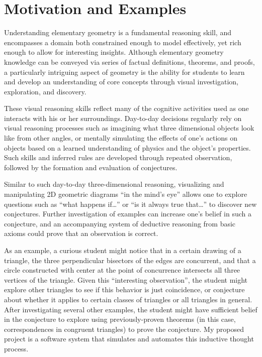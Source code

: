\chapter{Motivation and Examples}
\label{chap:motivation}

Understanding elementary geometry is a fundamental reasoning skill,
and encompasses a domain both constrained enough to model effectively,
yet rich enough to allow for interesting insights.  Although
elementary geometry knowledge can be conveyed via series of factual
definitions, theorems, and proofs, a particularly intriguing aspect of
geometry is the ability for students to learn and develop an
understanding of core concepts through visual investigation,
exploration, and discovery.

These visual reasoning skills reflect many of the cognitive activities
used as one interacts with his or her surroundings.  Day-to-day
decisions regularly rely on visual reasoning processes such as
imagining what three dimensional objects look like from other angles,
or mentally simulating the effects of one's actions on objects based
on a learned understanding of physics and the object's properties.
Such skills and inferred rules are developed through repeated
observation, followed by the formation and evaluation of conjectures.

Similar to such day-to-day three-dimensional reasoning, visualizing
and manipulating 2D geometric diagrams ``in the mind's eye'' allows
one to explore questions such as ``what happens if\ldots''  or ``is it
always true that\ldots''  to discover new conjectures.  Further
investigation of examples can increase one's belief in such a
conjecture, and an accompanying system of deductive reasoning from
basic axioms could prove that an observation is correct.

As an example, a curious student might notice that in a certain
drawing of a triangle, the three perpendicular bisectors of the edges
are concurrent, and that a circle constructed with center at the point
of concurrence intersects all three vertices of the triangle.  Given
this ``interesting observation'', the student might explore other
triangles to see if this behavior is just coincidence, or conjecture
about whether it applies to certain classes of triangles or all
triangles in general.  After investigating several other examples, the
student might have sufficient belief in the conjecture to explore
using previously-proven theorems (in this case, correspondences in
congruent triangles) to prove the conjecture.  My proposed project is
a software system that simulates and automates this inductive thought
process.

